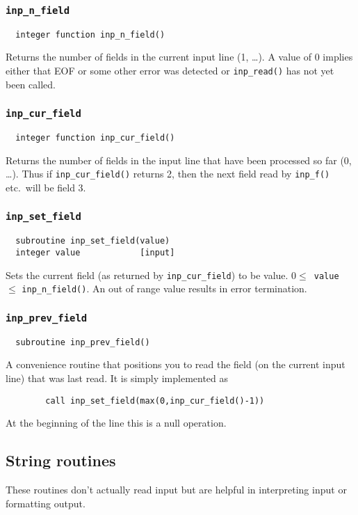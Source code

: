 \subsubsection{{\tt inp\_n\_field}}
\begin{verbatim}
  integer function inp_n_field()
\end{verbatim}
Returns the number of fields in the current input line (1, \ldots).  A
value of 0 implies either that EOF or some other error was detected or
{\tt inp\_read()} has not yet been called.

\subsubsection{{\tt inp\_cur\_field}}
\begin{verbatim}
  integer function inp_cur_field()
\end{verbatim}
Returns the number of fields in the input line that have been processed
so far (0, \ldots).  Thus if {\tt inp\_cur\_field()} returns 2, then the next
field read by {\tt inp\_f()} etc.\ will be field 3.

\subsubsection{{\tt inp\_set\_field}}
\begin{verbatim}
  subroutine inp_set_field(value)
  integer value            [input]
\end{verbatim}
Sets the current field (as returned by \verb+inp_cur_field+) to be
value.  $0 \le$~{\tt value}~$\le$ {\tt inp\_n\_field()}.  An out of
range value results in error termination.

\subsubsection{{\tt inp\_prev\_field}}
\begin{verbatim}
  subroutine inp_prev_field()
\end{verbatim}
A convenience routine that positions you to read the field (on the
current input line) that was last read.  It is simply implemented as
\begin{verbatim}
        call inp_set_field(max(0,inp_cur_field()-1))
\end{verbatim}
At the beginning of the line this is a null operation.


\subsection{String routines}
These routines don't actually read input but are helpful in
interpreting input or formatting output.

